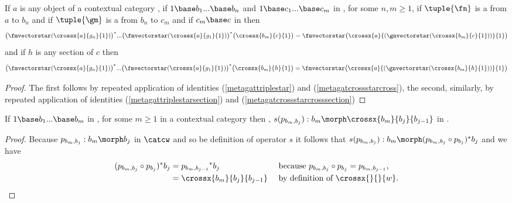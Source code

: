 \begin{lemma}
If $a$ is any object of a contextual category \catcw, if $1 \base b_1 ... \base b_n$ and $1 \base c_1 ... \base c_m$ in \catc, for some $n,m \ge 1$, 
if $\tuple{\fn}$ is a  from $a$ to $b_n$ and
if $\tuple{\gm}$ is a  from $b_n$ to $c_m$ and if  $c_m \base c$ in \catcw then
\begin{equation}
\label{cascadedpullbackscohereonobjects}
\big(\fmvectorstar (\crossx{a}{g_n}{1})\big)^* ... \big(\fmvectorstar (\crossx{a}{g_1}{1})\big) ^* \big(\crossx{b_m}{c}{1}\big) 
= \fmvectorstar \big(  \crossx{a}{(\gnvectorstar(\crossx{b_m}{c}{1}))}{1} \big)                                    
\end{equation}
and if  $h$ is any section of $c$ then 
\begin{equation}
\label{cascadedpullbackscohereonsections}
\big(\fmvectorstar (\crossx{a}{g_n}{1})\big)^* ... \big(\fmvectorstar (\crossx{a}{g_1}{1})\big) ^* \big(\crossx{b_m}{h}{1}\big) 
= \fmvectorstar \big(  \crossx{a}{(\gnvectorstar(\crossx{b_m}{h}{1}))}{1} \big)                                    
\end{equation}
\end{lemma}
\begin{proof}
The first follows by repeated application of identities (\ref{metagattriplestar}) and (\ref{metagatcrossstarcross}), 
the second, similarly, by repeated application of identities (\ref{metagattriplestarsection}) and (\ref{metagatcrossstarcrosssection})
\end{proof}

\begin{lemma}
If $1 \base b_1 ... \base b_m$ in \catc, for some $m \ge 1$ in a contextual category \catc then \foreachj,
$s(p_{b_m,b_j}): b_m \morph \crossx{b_m}{b_j}{b_{j-1}}$ in \catcw.
\end{lemma}
\begin{proof}
Because $p_{b_m,b_j}: b_m \morph b_j$ in $\catcw$ and so be definition of operator $s$ it follows that $s(p_{b_m,b_j}): b_m  \morph (p_{b_m,b_j} \circ p_{b_j})^*b_j$
and we have 
\begin{align*}
(p_{b_m,b_j} \circ p_{b_j})^*b_j &= {p_{b_m,b_{j-1}}} ^* b_j  && \mbox{ because $p_{b_m,b_j} \circ p_{b_j}=p_{b_m,b_{j-1}}$,} \\
                                 &= \crossx{b_m}{b_j}{b_{j-1}} && \mbox{ by definition of $\crossx{}{}{w}$}.
\end{align*}
\end{proof}

